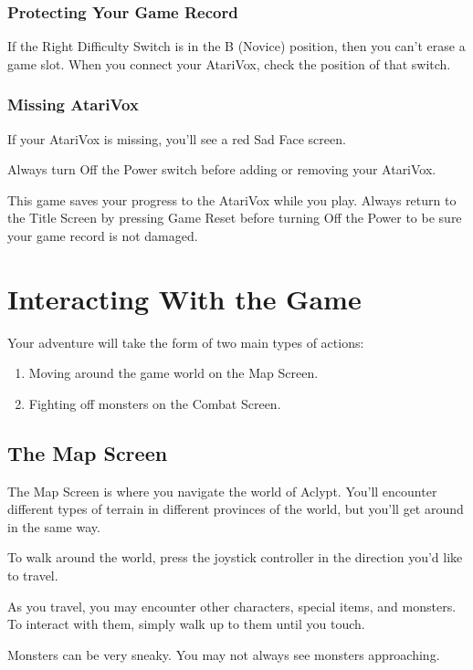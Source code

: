 \documentclass[10pt,twoside,openright]{memoir}
\begin{document}
\subsection{Protecting Your Game Record}

If the Right  Difficulty Switch is in the B  (Novice) position, then you
can't  erase a  game slot.  When you  connect your  AtariVox, check  the
position of that switch.

\subsection{Missing AtariVox}

If your AtariVox is missing, you'll see a red Sad Face screen.

Always   turn  Off   the  Power   switch  before   adding  or   removing
your AtariVox.

This game saves your progress to the AtariVox while you play.  Always
return to the Title Screen by pressing Game Reset before turning Off
the Power to be sure your game record is not damaged.

\chapter{Interacting With the Game}

Your adventure will take the form of two main types of actions:

\begin{enumerate}
\item Moving around the game world on the Map Screen.
\item Fighting off monsters on the Combat Screen.
\end{enumerate}

\section{The Map Screen}

The Map Screen is where you navigate the world of Aclypt. You'll
encounter different types of terrain in different provinces of the
world, but you'll get around in the same way.

To walk around the world, press the joystick controller in the
direction you'd like to travel.

As you travel, you may encounter other characters, special items, and
monsters. To interact with them, simply walk up to them until you
touch.

Monsters can be very sneaky. You may not always see monsters
approaching.
\end{document}
